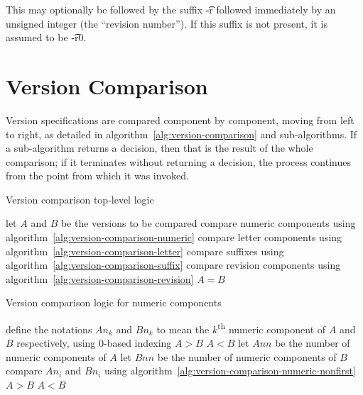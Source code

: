 This may optionally be followed by the suffix \t{-r} followed immediately by an unsigned integer
(the ``revision number''). If this suffix is not present, it is assumed to be \t{-r0}.

\section{Version Comparison}

Version specifications are compared component by component, moving from left to right,
as detailed in algorithm~\ref{alg:version-comparison} and sub-algorithms.
If a sub-algorithm returns a decision, then that is the result of the whole comparison;
if it terminates without returning a decision, the process continues from the point
from which it was invoked.

\begin{algorithm}[p]
\caption{Version comparison top-level logic} \label{alg:version-comparison}
\begin{algorithmic}[1]
    \STATE let $A$ and $B$ be the versions to be compared
    \STATE compare numeric components using algorithm~\ref{alg:version-comparison-numeric}
    \STATE compare letter components using algorithm~\ref{alg:version-comparison-letter}
    \STATE compare suffixes using algorithm~\ref{alg:version-comparison-suffix}
    \STATE compare revision components using algorithm~\ref{alg:version-comparison-revision}
    \RETURN $A=B$
\end{algorithmic}
\end{algorithm}

\begin{algorithm}[p]
\caption{Version comparison logic for numeric components} \label{alg:version-comparison-numeric}
\begin{algorithmic}[1]
  \STATE define the notations $An_k$ and $Bn_k$ to mean the $k$\textsuperscript{th} numeric
      component of $A$ and $B$ respectively, using $0$-based indexing
    \RETURN $A>B$
    \RETURN $A<B$
  \ENDIF
  \STATE let $Ann$ be the number of numeric components of $A$
  \STATE let $Bnn$ be the number of numeric components of $B$
    \STATE compare $An_i$ and $Bn_i$ using algorithm~\ref{alg:version-comparison-numeric-nonfirst}
  \ENDFOR
    \RETURN $A>B$
    \RETURN $A<B$
  \ENDIF
\end{algorithmic}
\end{algorithm}

